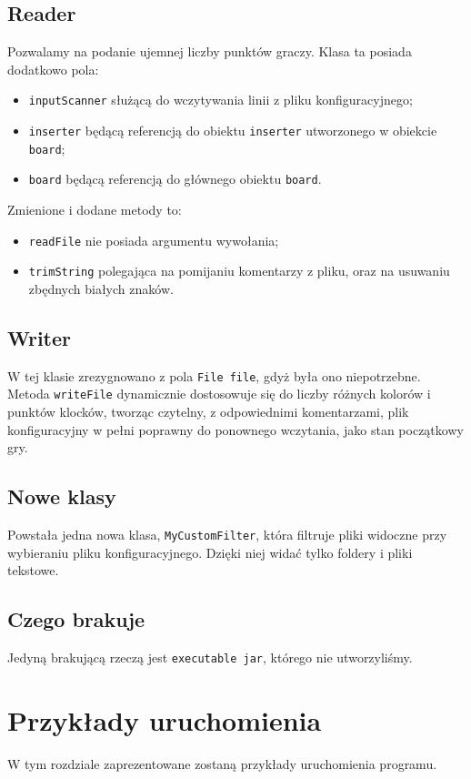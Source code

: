 \documentclass[12pt]{report}
\newcommand{\code}[1]{\texttt{#1}}
\begin{document}
    \subsection{Reader}
    Pozwalamy na podanie ujemnej liczby punktów graczy. Klasa ta posiada dodatkowo pola:
    \begin{itemize}
        \item \code{inputScanner} służącą do wczytywania linii z pliku konfiguracyjnego;
        \item \code{inserter} będącą referencją do obiektu \code{inserter} utworzonego w obiekcie \code{board};
        \item \code{board} będącą referencją do głównego obiektu \code{board}.
    \end{itemize}
    Zmienione i dodane metody to:
    \begin{itemize}
        \item \code{readFile} nie posiada argumentu wywołania;
        \item \code{trimString} polegająca na pomijaniu komentarzy z pliku, oraz na usuwaniu zbędnych białych znaków.
    \end{itemize}
    
    \subsection{Writer}
    W tej klasie zrezygnowano z pola \code{File file}, gdyż była ono niepotrzebne. Metoda \code{writeFile} dynamicznie dostosowuje się do liczby różnych kolorów i punktów klocków, tworząc czytelny, z odpowiednimi komentarzami, plik konfiguracyjny w pełni poprawny do ponownego wczytania, jako stan początkowy gry.
        
    \subsection{Nowe klasy}
    Powstała jedna nowa klasa, \code{MyCustomFilter}, która filtruje pliki widoczne przy wybieraniu pliku konfiguracyjnego. Dzięki niej widać tylko foldery i pliki tekstowe.
    \subsection{Czego brakuje}
    Jedyną brakującą rzeczą jest \code{executable jar}, którego nie utworzyliśmy.

\section{Przykłady uruchomienia}
W tym rozdziale zaprezentowane zostaną przykłady uruchomienia programu.
\end{document}
